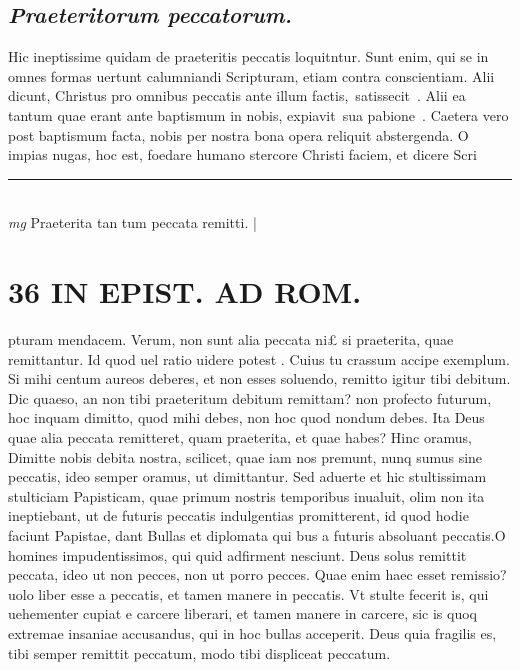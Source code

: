\documentclass{article}
\begin{document}
\begin{pages}
\subsection*{\textit{Praeteritorum peccatorum. }}\pstart Hic ineptissime quidam de praeteritis peccatis loquitntur. Sunt enim, qui se in omnes formas uertunt calumniandi Scripturam, etiam contra conscientiam.  Alii dicunt, Christus pro omnibus peccatis ante illum factis, satissecit . Alii ea tantum quae erant ante baptismum in nobis, expiavit sua pabione . Caetera vero post baptismum facta, nobis per nostra bona opera reliquit abstergenda. O impias nugas, hoc est, foedare humano stercore Christi faciem, et dicere Scri\pend
\vspace{0.5cm}\noindent
\vspace{0.2cm}\rule{1cm}{0.2pt}\\ 
\hspace{0.2cm}\textit{mg}
\footnotesize Praeterita tan tum peccata remitti.  
\normalsize| 
\section*{36 IN EPIST. AD ROM.  }
\marginpar{[ p.]}\pstart pturam mendacem. Verum, non sunt alia peccata ni£ si praeterita, quae remittantur. Id quod uel ratio uidere potest . Cuius tu crassum accipe exemplum.  Si mihi centum aureos deberes, et non esses soluendo, remitto igitur tibi debitum. Dic quaeso, an non tibi praeteritum debitum remittam? non profecto futurum, hoc inquam dimitto, quod mihi debes, non hoc quod nondum debes. Ita Deus quae alia peccata remitteret, quam praeterita, et quae habes? Hinc oramus, Dimitte nobis debita nostra, scilicet, quae iam nos premunt, nunq sumus sine peccatis, ideo semper oramus, ut dimittantur. Sed aduerte et hic stultissimam stulticiam Papisticam, quae primum nostris temporibus inualuit, olim non ita ineptiebant, ut de futuris peccatis indulgentias promitterent, id quod hodie faciunt Papistae, dant Bullas et diplomata qui bus a futuris absoluant peccatis.O homines impudentissimos, qui quid adfirment nesciunt. Deus solus remittit peccata, ideo ut non pecces, non ut porro pecces. Quae enim haec esset remissio? uolo liber esse a peccatis, et tamen manere in peccatis. Vt stulte fecerit is, qui uehementer cupiat e carcere liberari, et tamen manere in carcere, sic is quoq extremae insaniae accusandus, qui in hoc bullas acceperit. Deus quia fragilis es, tibi semper remittit peccatum, modo tibi displiceat peccatum.   \pend
{}
{}

\end{pages}
\end{document}
